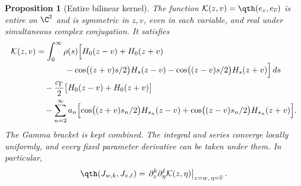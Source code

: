 \documentclass[11pt,a4paper]{article}
\numberwithin{equation}{section}
\newtheorem{proposition}[theorem]{Proposition}
\theoremstyle{definition}\newtheorem{definition}[theorem]{Definition}
\theoremstyle{remark}\newtheorem{remark}[theorem]{Remark}
\begin{document}
\begin{proposition}[Entire bilinear kernel]\label{e:prop:kernel}
The function
$\mathcal K(z,v)=\qth(e_z,e_{\overline v})$ is entire on $\C^2$ and is
symmetric in $z,v$, even in each variable, and real under simultaneous
complex conjugation. It satisfies
\begin{align}\label{e:eq:kernel}
 \mathcal K(z,v)
 &=\int_0^\infty\rho(s)\Bigl[
 H_0(z-v)+H_0(z+v)\notag\\[-2pt]
 &\hspace{3.5em}-\cos\bigl((z+v)s/2\bigr)H_s(z-v)
 -\cos\bigl((z-v)s/2\bigr)H_s(z+v)\Bigr]\,ds\notag\\
 &\quad-\frac{c_\Gamma}{2}\bigl[H_0(z-v)+H_0(z+v)\bigr]\notag\\
 &\quad-\sum_{n=2}^\infty a_n\Bigl[
 \cos\bigl((z+v)s_n/2\bigr)H_{s_n}(z-v)
 +\cos\bigl((z-v)s_n/2\bigr)H_{s_n}(z+v)\Bigr].
\end{align}
The Gamma bracket is kept combined. The integral and series converge
locally uniformly, and every fixed parameter derivative can be taken under
them. In particular,
\begin{equation}\label{e:eq:jet-matrix}
 \qth(J_{w,k},J_{v,\ell})
 =\left.\partial_z^k\partial_\eta^\ell\mathcal K(z,\eta)
 \right|_{z=w,\,\eta=\overline v}.
\end{equation}
\end{proposition}
\end{document}
